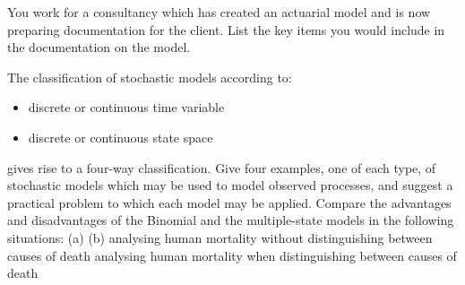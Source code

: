 \documentclass[a4paper,12pt]{article}
\begin{document}
\begin{enumerate}
You work for a consultancy which has created an actuarial model and is now
preparing documentation for the client.
List the key items you would include in the documentation on the model.



The classification of stochastic models according to:
\begin{itemize}
\item
discrete or continuous time variable
\item discrete or continuous state space
\end{itemize}
gives rise to a four-way classification.
Give four examples, one of each type, of stochastic models which may be used to
model observed processes, and suggest a practical problem to which each model may
be applied.
Compare the advantages and disadvantages of the Binomial and the multiple-state
models in the following situations:
(a)
(b)
analysing human mortality without distinguishing between causes of death
analysing human mortality when distinguishing between causes of death


\end{enumerate}
\end{document}
